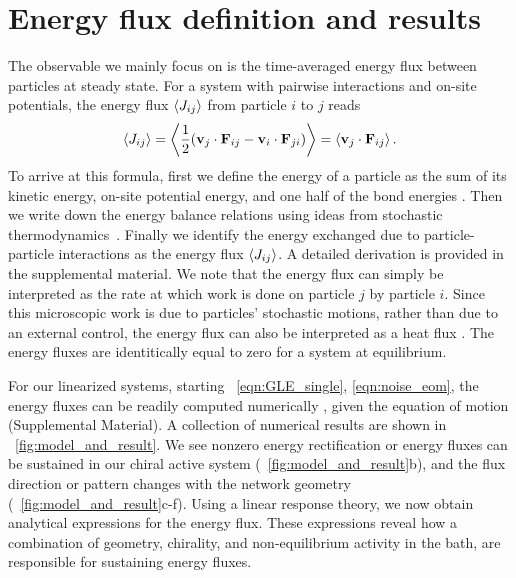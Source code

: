 \documentclass[
 preprint,
 preprintnumbers,
 amsmath,amssymb,
 aps,
 pre,
 longbibliography,
 superscriptaddress,
 10pt, twocolumn
]{revtex4-1}
\begin{document}
\section{Energy flux definition and results} \label{sec:flux}
The observable we mainly focus on is the time-averaged energy flux between particles at steady state. For a system with pairwise interactions and on-site potentials, the energy flux $\expval{J_{ij}}$ from particle $i$ to $j$ reads
\begin{equation} \label{eqn:flux_def}
    \expval{J_{ij}} = \expval{\frac{1}{2} (\mathbf{v}_j \cdot \mathbf{F}_{ij} - \mathbf{v}_i \cdot \mathbf{F}_{ji})}
    = \expval{\mathbf{v}_j \cdot \mathbf{F}_{ij}}.
\end{equation}
To arrive at this formula, first we define the energy of a particle as the sum of its kinetic energy, on-site potential energy, and one half of the bond energies \cite{Lepri2003ThermalConduction}. Then we write down the energy balance relations using ideas from stochastic thermodynamics~\cite{Sekimoto1998LangevinEquation}. Finally we identify the energy exchanged due to particle-particle interactions as the energy flux $\expval{J_{ij}}$. A detailed derivation is provided in the supplemental material. 
We note that the energy flux can simply be interpreted  as the rate at which work is done on particle $j$ by particle $i$.
Since this microscopic work is due to particles' stochastic motions, rather than due to an external control, the energy flux can also be interpreted as a heat flux \cite{Sekimoto1998LangevinEquation,Lepri2003ThermalConduction}. The energy fluxes are identitically equal to zero for a system at equilibrium. 

For our linearized systems, starting \eqnname~\eqref{eqn:GLE_single}, \eqref{eqn:noise_eom}, the energy fluxes can be readily computed numerically \cite{Gardiner2009ItoCalculus,Ceriotti2010ColoredNoiseThermostats}, given the equation of motion  (Supplemental Material).
A collection of numerical results are shown in \figurename~\ref{fig:model_and_result}. We see nonzero energy rectification or energy fluxes can be sustained in our chiral active system (\figurename~\ref{fig:model_and_result}b), and the flux direction or pattern changes with the network geometry (\figurename~\ref{fig:model_and_result}c-f). Using a linear response theory, we now obtain analytical expressions for the energy flux. These expressions reveal how a combination of geometry, chirality, and non-equilibrium activity in the bath, are responsible for sustaining energy fluxes. 
\end{document}
